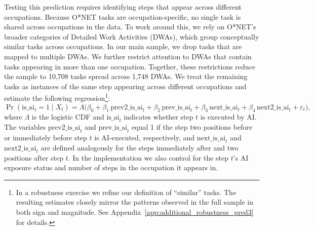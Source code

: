 Testing this prediction requires identifying steps that appear across different occupations.
Because O*NET tasks are occupation-specific, no single task is shared across occupations in the data.
To work around this, we rely on O*NET's broader categories of Detailed Work Activities (DWAs), which group conceptually similar tasks across occupations.
In our main sample, we drop tasks that are mapped to multiple DWAs.
We further restrict attention to DWAs that contain tasks appearing in more than one occupation.
Together, these restrictions reduce the sample to 10{,}708 tasks spread across 1{,}748 DWAs.
We treat the remaining tasks as instances of the same step appearing across different occupations and estimate the following regression\footnote{In a robustness exercise we refine our definition of ``similar'' tasks.
The resulting estimates closely mirror the patterns observed in the full sample in both sign and magnitude.
See Appendix~\ref{app:additional_robustness_pred3} for details.}:
\begin{equation}
    \Pr\!\left( \text{is\_ai}_{t} = 1 \mid X_t \right)
    =
    \Lambda\!\Big(
        \beta_0
        + \beta_1 \, \text{prev2\_is\_ai}_{t}
        + \beta_2 \, \text{prev\_is\_ai}_{t}
        + \beta_3 \, \text{next\_is\_ai}_{t}
        + \beta_4 \, \text{next2\_is\_ai}_{t}
        + \varepsilon_t
    \Big),
    \label{eq:DWA_regression_ai}
\end{equation}
where $\Lambda$ is the logistic CDF and \emph{$\text{is\_ai}_{t}$} indicates whether step $t$ is executed by AI.
The variables \emph{$\text{prev2\_is\_ai}_{t}$} and \emph{$\text{prev\_is\_ai}_{t}$} equal 1 if the step two positions before or immediately before step $t$ is AI-executed, respectively, and \emph{$\text{next\_is\_ai}_{t}$} and \emph{$\text{next2\_is\_ai}_{t}$} are defined analogously for the steps immediately after and two positions after step $t$.
In the implementation we also control for the step $t$'s AI exposure status and number of steps in the occupation it appears in.

